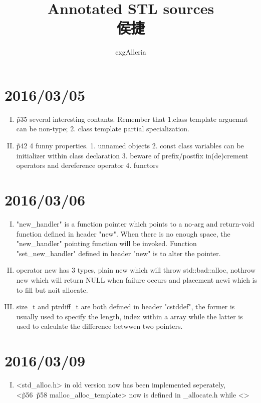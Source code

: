 \documentclass{ctexart}
\begin{document}
\title{%
	Annotated STL sources\\
		侯捷
}
\author{%
	cxgAlleria
}
\maketitle

\tableofcontents
\section[0305]{2016/03/05}
	\begin{enumerate}[I.]
		\item \~ p35 several interesting contants. Remember that 1.class template arguemnt can be non-type; 2. class template partial specialization.
		\item \~ p42 4 funny properties. 1. unnamed objects 2. const class variables can be initializer within class declaration 3. beware of prefix/postfix in(de)crement operators and dereference operator 4. functors
	\end{enumerate}
	
\section[0306]{2016/03/06}
	\begin{enumerate}[I.]
		\item "new\_handler" is a function pointer which points to a no-arg and return-void function defined in header "new". When there is no enough space, the "new\_handler" pointing function will be invoked. Function "set\_new\_handler" defined in header "new" is to alter the pointer.
		\item operator new has 3 types, plain new which will throw std::bad::alloc, nothrow new which will return NULL when failure occurs and placement newi which is to fill but noit allocate. 
		\item size\_t and ptrdiff\_t are both defined in header "cstddef", the former is usually used to specify the length, index within a array while the latter is used to calculate the difference betwwen two pointers. 
	\end{enumerate}
\section[0309]{2016/03/09}
	\begin{enumerate}[I.]
		\item <std_alloc.h> in old version now has been implemented seperately, <\~ p56{~}\~ p58 malloc_alloc_template> now is defined in \ext\malloc_allocate.h while <>
	\end{enumerate}
\end{document}
